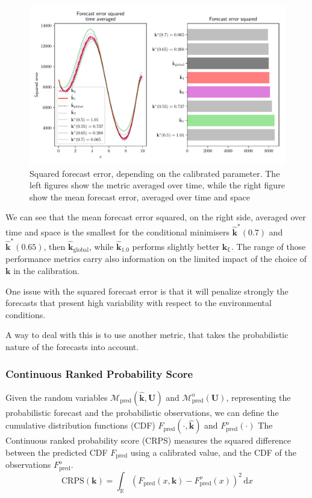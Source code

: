 \documentclass[preprint, 1p]{elsarticle}
\newcommand{\Ex}{\mathbb{E}}
\newcommand{\hatkmean}{\hat{\mathbf{k}}_{\Ex}}
\newcommand{\kest}{\hat{\mathbf{k}}}
\begin{document}
\begin{figure}[!h]
\centering
\includegraphics[width=.9\textwidth]{Figures/L2_full.pdf}
\caption{Squared forecast error, depending on the calibrated parameter. The left figures show the metric averaged over time, while the right figure show the mean forecast error, averaged over time and space}
\label{fig:forecast_squared_error}
\end{figure}
We can see that the mean forecast error squared, on the right side, averaged over time and space is the smallest for the conditional minimisers $\kest^*(0.7)$ and $\kest^*(0.65)$, then $\kest_{\mathrm{global}}$, while $\kest_{1.0}$ performs slightly better $\hatkmean$. The range of those performance metrics carry also information on the limited impact of the choice of $\mathbf{k}$ in the calibration.

One issue with the squared forecast error is that it will penalize strongly the forecasts that present high variability with respect to the environmental conditions.

A way to deal with this is to use another metric, that takes the probabilistic nature of the forecasts into account.

\subsubsection{Continuous Ranked Probability Score}
Given the random variables $\mathcal{M}_{\mathrm{pred}}(\kest, \mathbf{U})$ and $\mathcal{M}_{\mathrm{pred}}^o(\mathbf{U})$, representing the probabilistic forecast and the probabilistic observations, we can define the cumulative distribution functions (CDF) $F_{\mathrm{pred}}(\cdot, \kest)$ and $F^o_{\mathrm{pred}}(\cdot)$
The Continuous ranked probability score (CRPS) measures the squared difference between the predicted CDF $F_{\mathrm{pred}}$ using a calibrated value, and the CDF of the observations $F_{\mathrm{pred}}^o$. 
\begin{equation}
\label{eq:def_crps}
\mathrm{CRPS}(\mathbf{k}) = \int_{\mathbb{R}} (F_{\mathrm{pred}}(x,\mathbf{k}) - F^o_{\mathrm{pred}}(x))^2 \,\mathrm{d}x
\end{equation}
\end{document}
